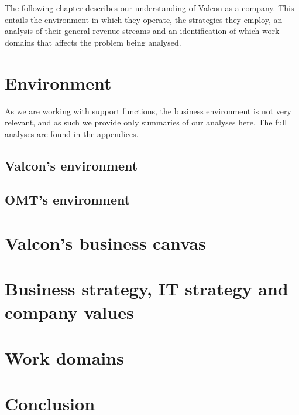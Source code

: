 The following chapter describes our understanding of Valcon as a company. This entails the environment in which they operate, the strategies they employ, an analysis of their general revenue streams and an identification of which work domains that affects the problem being analysed.

\section{Environment}
As we are working with support functions, the business environment is not very relevant, and as such we provide only summaries of our analyses here.
The full analyses are found in the appendices.
\subsection{Valcon's environment}

\subsection{OMT's environment}

\section{Valcon's business canvas}

\section{Business strategy, IT strategy and company values}

\section{Work domains}

\section{Conclusion}
